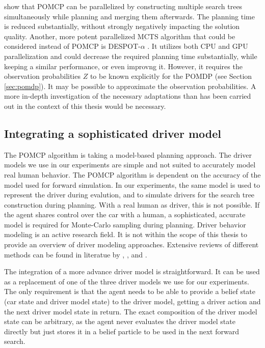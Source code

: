 \cite{pomcp-parallel} show that POMCP can be parallelized by constructing multiple search trees simultaneously while planning and merging them afterwards. The planning time is reduced substantially, without strongly negatively impacting the solution quality. Another, more potent parallelized MCTS algorithm that could be considered instead of POMCP is DESPOT-$\alpha$ \parencite{despot-a}. It utilizes both CPU and GPU parallelization and could decrease the required planning time substantially, while keeping a similar performance, or even improvng it. However, it requires the observation probabilities $Z$ to be known explicitly for the POMDP (see Section \ref{sec:pomdp}). It may be possible to approximate the observation probabilities. A more in-depth investigation of the necessary adaptations than has been carried out in the context of this thesis would be necessary.

\subsection{Integrating a sophisticated driver model}
\label{sec:complex-driver}

The POMCP algorithm is taking a model-based planning approach. The driver models we use in our experiments are simple and not suited to accurately model real human behavior. The POMCP algorithm is dependent on the accuracy of the model used for forward simulation. In our experiments, the same model is used to represent the driver during evalution, and to simulate drivers for the search tree construction during planning. With a real human as driver, this is not possible. If the agent shares control over the car with a human, a sophisticated, accurate model is required for Monte-Carlo sampling during planning. Driver behavior modeling is an active research field. It is not within the scope of this thesis to provide an overview of driver modeling approaches. Extensive reviews of different methods can be found in literatue by \cite{model-review-3}, \cite{model-review-4}, and \cite{model-review-5}.

The integration of a more advance driver model is straightforward. It can be used as a replacement of one of the three driver models we use for our experiments. The only requirement is that the agent needs to be able to provide a belief state (car state and driver model state) to the driver model, getting a driver action and the next driver model state in return. The exact composition of the driver model state can be arbitrary, as the agent never evaluates the driver model state directly but just stores it in a belief particle to be used in the next forward search.

